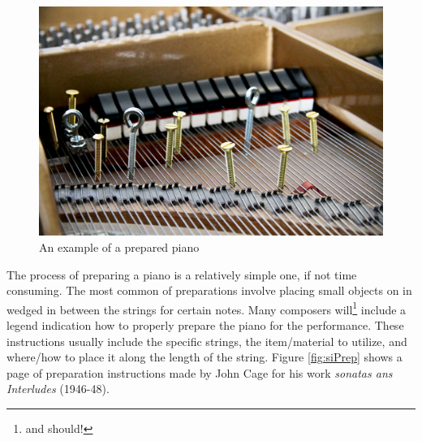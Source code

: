 \begin{figure}
    \centering
    \includegraphics[scale=0.2]{diagrams/IMG_9734_1.jpg}
    \caption{An example of a prepared piano} %
    \label{fig:pp}
\end{figure}

The process of preparing a piano is a relatively simple one, if not time consuming. The most common of preparations involve placing small objects on in wedged in between the strings for certain notes. Many composers will\footnote{and should!} include a legend indication how to properly prepare the piano for the performance. These instructions usually include the specific strings, the item/material to utilize, and where/how to place it along the length of the string. Figure \ref{fig:siPrep} shows a page of preparation instructions made by John Cage for his work \textit{sonatas ans Interludes} (1946-48).



